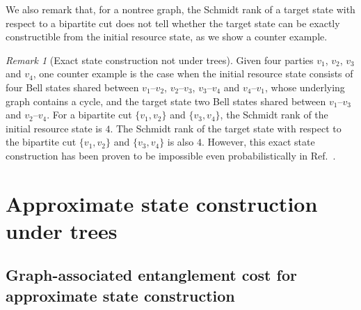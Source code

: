 \documentclass[preprintnumbers,aps,amsmath,amssymb,pra,twocolumn,showpacs,superscriptaddress,floatfix]{revtex4-1}
\theoremstyle{plain}
\theoremstyle{definition}
\theoremstyle{remark}
\newtheorem{remark}[conjecture]{Remark}
\begin{document}
We also remark that, for a nontree graph, the Schmidt rank of a target state with respect to a bipartite cut does not tell whether the target state can be exactly constructible from the initial resource state, as we show a counter example.
\begin{remark}[\label{ex:3}Exact state construction not under trees]
    Given four parties $v_1$, $v_2$, $v_3$ and $v_4$, one counter example is the case when the initial resource state consists of four Bell states shared between $v_1$--$v_2$, $v_2$--$v_3$, $v_3$--$v_4$ and $v_4$--$v_1$, whose underlying graph contains a cycle, and the target state two Bell states shared between $v_1$--$v_3$ and  $v_2$--$v_4$.  For a bipartite cut $\{v_1,v_2\}$ and $\{v_3,v_4\}$, the Schmidt rank of the initial resource state is $4$.  The Schmidt rank of the target state with respect to the bipartite cut $\{v_1,v_2\}$ and $\{v_3,v_4\}$ is also $4$.  However, this exact state construction has been proven to be impossible even probabilistically in Ref.~\cite{RefWorks:167}.
\end{remark}

\section{\label{sec:4}Approximate state construction under trees}

\subsection{Graph-associated entanglement cost for approximate state construction}
\end{document}
